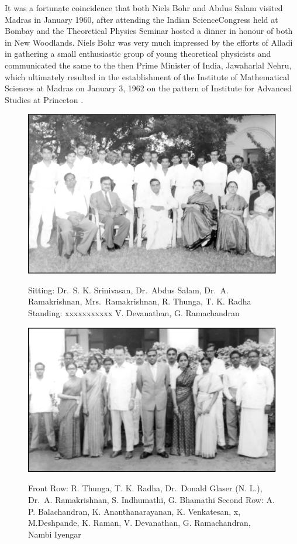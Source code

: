 It was a fortunate coincidence that both Niels Bohr and Abdus Salam visited Madras in January 1960, after attending the Indian Science\break Congress held at Bombay and the Theoretical Physics Seminar hosted a dinner in honour of both in New Woodlands. Niels Bohr was very much impressed by the efforts of Alladi in gathering a small enthusiastic group of young theoretical physicists and communicated the same to the then Prime Minister of India, Jawaharlal Nehru, which ultimately resulted in the establishment of the Institute of Mathematical Sciences at Madras 	on January 3, 1962 on the pattern of Institute for Advanced Studies at Princeton \cite{chap3-key9}.

\begin{figure}[H]
\centering
\includegraphics[scale=.3]{src/images/chap3/chap3-fig1.eps}\\
\caption{Sitting: Dr.\ S. K. Srinivasan, Dr.\ Abdus Salam, Dr.\ A. Ramakrishnan, Mrs.\ Ramakrishnan, R. Thunga, T. K. Radha
Standing: xxxxxxxxxxx V. Devanathan, G. Ramachandran}
\end{figure}

\begin{figure}[H]
\centering
\includegraphics[scale=.3]{src/images/chap3/chap3-fig2.eps}\\
\caption{Front Row: R. Thunga, T. K. Radha, Dr.\ Donald Glaser (N. L.), Dr.\ A. Ramakrishnan, S. Indhumathi, G. Bhamathi
Second Row: A. P. Balachandran, K. Ananthanarayanan, K. Venkatesan, x, M.Deshpande, K. Raman, V. Devanathan, G. Ramachandran, Nambi Iyengar}
\end{figure}

